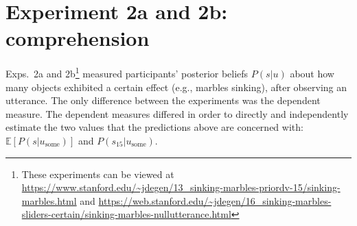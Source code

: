 \documentclass[10pt,letterpaper]{article}
\newcommand{\red}[1]{\textcolor{Red}{#1}}
\begin{document}
%




\section{Experiment 2a and 2b: comprehension}  


Exps.~2a and 2b\footnote{These experiments can be viewed at \url{https://www.stanford.edu/~jdegen/13_sinking-marbles-priordv-15/sinking-marbles.html} and \url{https://web.stanford.edu/~jdegen/16_sinking-marbles-sliders-certain/sinking-marbles-nullutterance.html}}  measured participants' posterior beliefs $P(s|u)$ about how many objects exhibited a certain effect (e.g., marbles sinking), after observing an utterance. The only difference between the experiments was the dependent measure. The dependent measures differed in order to directly and independently estimate the two values that the  predictions above are concerned with: $\mathbb{E}[P(s|u_{\textrm{some}})]$ and $P(s_{15}|u_{\textrm{some}})$.
\end{document}
